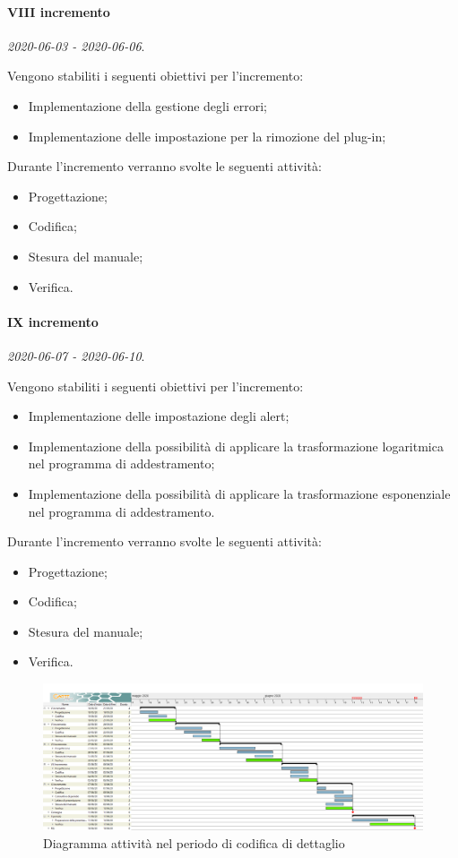 \documentclass[../piano-di-progetto.tex]{subfiles}
\begin{document}
\paragraph{VIII incremento}
\emph{2020-06-03 - 2020-06-06}. 
 
 Vengono stabiliti i seguenti obiettivi per l'incremento:
 \begin{itemize}
    \item Implementazione della gestione degli errori;
    \item Implementazione delle impostazione per la rimozione del plug-in;

 \end{itemize}

Durante l'incremento verranno svolte le seguenti attività: 
\begin{itemize}
    \item Progettazione;
    \item Codifica;
    \item Stesura del manuale;
    \item Verifica.
\end{itemize}

\paragraph{IX incremento}
\emph{2020-06-07 - 2020-06-10}. 
 
 Vengono stabiliti i seguenti obiettivi per l'incremento:
 \begin{itemize}
    \item Implementazione delle impostazione degli alert;
    \item Implementazione della possibilità di applicare la trasformazione logaritmica nel programma di addestramento;
    \item Implementazione della possibilità di applicare la trasformazione esponenziale nel programma di addestramento.

 \end{itemize}

Durante l'incremento verranno svolte le seguenti attività: 
\begin{itemize}
    \item Progettazione;
    \item Codifica;
    \item Stesura del manuale;
    \item Verifica.
\end{itemize}



\newpage
\begin{landscape}
    \begin{figure}[H]
        \centering
        \includegraphics[width=24cm]{img/codifica.png}
        \caption{Diagramma attività nel periodo di codifica di dettaglio}
      \end{figure}
\end{landscape}
\end{document}
